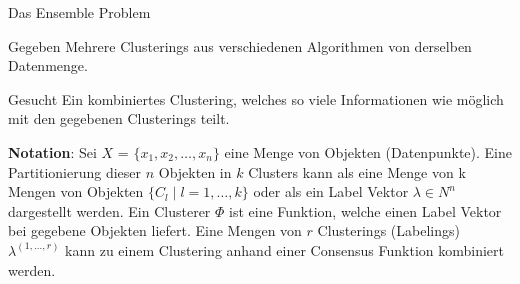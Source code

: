 \documentclass{beamer}
\begin{document}
\begin{frame}{Das Ensemble Problem}
	\begin{block}{Gegeben}
		Mehrere Clusterings aus verschiedenen Algorithmen von derselben Datenmenge.
	\end{block}
	\begin{block}{Gesucht}
		Ein kombiniertes Clustering, welches so viele Informationen wie möglich mit den gegebenen Clusterings teilt. 
	\end{block}
	\textbf{Notation}: Sei $X$ = $\{x_1, x_2, \ldots, x_n\}$ eine Menge von Objekten (Datenpunkte). Eine Partitionierung dieser $n$ Objekten in $k$ Clusters kann als eine Menge von k Mengen von Objekten $\{C_{l} \mid l = 1, \ldots, k\}$ oder als ein Label Vektor $\lambda \in {N}^{n}$ dargestellt werden. Ein Clusterer $\Phi$ ist eine Funktion, welche einen Label Vektor bei gegebene Objekten liefert. Eine Mengen von $r$ Clusterings (Labelings) $\lambda^{(1, \dots, r)}$ kann zu einem Clustering anhand einer Consensus Funktion kombiniert werden.
\end{frame}
\end{document}
